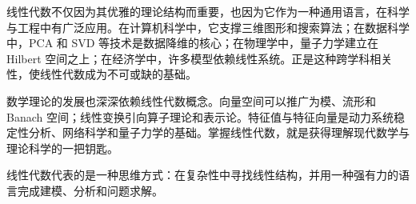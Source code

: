 线性代数不仅因为其优雅的理论结构而重要，也因为它作为一种通用语言，在科学与工程中有广泛应用。在计算机科学中，它支撑三维图形和搜索算法；在数据科学中，PCA 和 SVD 等技术是数据降维的核心；在物理学中，量子力学建立在 Hilbert 空间之上；在经济学中，许多模型依赖线性系统。正是这种跨学科相关性，使线性代数成为不可或缺的基础。

数学理论的发展也深深依赖线性代数概念。向量空间可以推广为模、流形和 Banach 空间；线性变换引向算子理论和表示论。特征值与特征向量是动力系统稳定性分析、网络科学和量子力学的基础。掌握线性代数，就是获得理解现代数学与理论科学的一把钥匙。

线性代数代表的是一种思维方式：在复杂性中寻找线性结构，并用一种强有力的语言完成建模、分析和问题求解。

\vspace{1cm}
